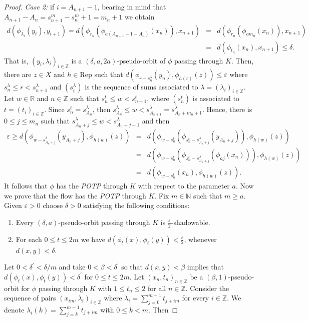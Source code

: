 \documentclass{amsart}
\theoremstyle{definition}
\newcommand{\ep}{\varepsilon}
\begin{document}
\begin{proof}
{\em Case 2:} if $i=A_{n+1}-1$, bearing in mind that $A_{n+1}-A_n=s_{n+1}^m-s_{n}^m+1=m_n+1$ we obtain
\begin{eqnarray*}
d(\phi_{\lambda_i}(y_i),y_{i+1})=d(\phi_{r_n}(\phi_{a(A_{n+1}-1-A_n)}(x_n)),x_{n+1})&=&d(\phi_{r_n}(\phi_{am_n}(x_n)),x_{n+1})\\ &=& d(\phi_{t_n}(x_n),x_{n+1})\leq \delta.
\end{eqnarray*}
That is, $(y_i,\lambda_i)_{i\in\mathbb{Z}}$ is a $(\delta,a,2a)$-pseudo-orbit of $\phi$ passing through $K$. Then, there are $z\in X$ and $h\in \mathrm{Rep}$ such that $d(\phi_{r-s^{\lambda}_n}(y_n),\phi_{h(r)}(z))\leq \ep$ where $s^{\lambda}_n\leq r<s^{\lambda}_{n+1}$ and $(s^{\lambda}_i)$ is the sequence of sums associated to $\lambda=(\lambda_i)_{i\in \mathbb{Z}}$. Let $w\in \mathbb{R}$ and $n\in \mathbb{Z}$ such that $s^{t}_n\leq w<s^{t}_{n+1}$, where $(s^{t}_n)$ is associated to $t=(t_i)_{i\in \mathbb{Z}}$. Since $s^{t}_n=s^{\lambda}_{A_n}$, then $s^{\lambda}_{A_n}\leq w<s^{\lambda}_{A_{n+1}}=s^{\lambda}_{A_n+m_n+1}$. Hence, there is $0\leq j\leq m_n$ such that $s^{\lambda}_{A_n+j}\leq w<s^{\lambda}_{A_{n}+j+1}$ and then
\begin{eqnarray*}
\ep \geq d(\phi_{w-s^{\lambda}_{A_n+j}}(y_{A_n+j}),\phi_{h(w)}(z))&=& d(\phi_{w-s^{t}_n}(\phi_{s^{t}_n-s^{\lambda}_{A_n+j}}(y_{A_n+j})),\phi_{h(w)}(z))\\
&=& d(\phi_{w-s^{t}_n}(\phi_{s^{t}_n-s^{\lambda}_{A_n+j}}(\phi_{aj}(x_n))),\phi_{h(w)}(z))\\
&=& d(\phi_{w-s^{t}_n}(x_n),\phi_{h(w)}(z)).
\end{eqnarray*}
It follows that $\phi$ has the {\em POTP} through $K$ with respect to the parameter $a$. Now we prove that the flow has the  {\em POTP} through $K$. Fix $m\in \mathbb{N}$ such that $m\geq a$. Given $\ep>0$ choose $\delta>0$ satisfying the following conditions:

\begin{enumerate}
\item Every $(\delta,a)$-pseudo-orbit passing through $K$ is $\frac{\ep}{2}$-shadowable.
\item For each $0\leq t\leq 2m$ we have $d(\phi_t(x),\phi_t(y))<\frac{\ep}{2}$, whenever $d(x,y)<\delta$.
\end{enumerate}
Let $0<\delta^{\prime}<\delta/m$ and take $0<\beta<\delta^{\prime}$ so that $d(x,y)<\beta$ implies that $d(\phi_t(x),\phi_t(y))<\delta^{\prime}$ for $0\leq t\leq 2m$. Let $(x_n,t_n)_{n\in \mathbb{Z}}$ be a $(\beta,1)$-pseudo-orbit for $\phi$ passing through $K$ with $1\leq t_n\leq 2$ for all $n\in \mathbb{Z}$. Consider the sequence of pairs $(x_{im},\lambda_i)_{i\in \mathbb{Z}}$ where $\lambda_i=\sum_{j=0}^{m-1}t_{j+im}$ for every $i\in\mathbb{Z}$. We denote $\lambda_i(k)=\sum_{j=k}^{m-1}t_{j+im}$ with $0\leq k<m$. Then


\end{proof}
\end{document}
